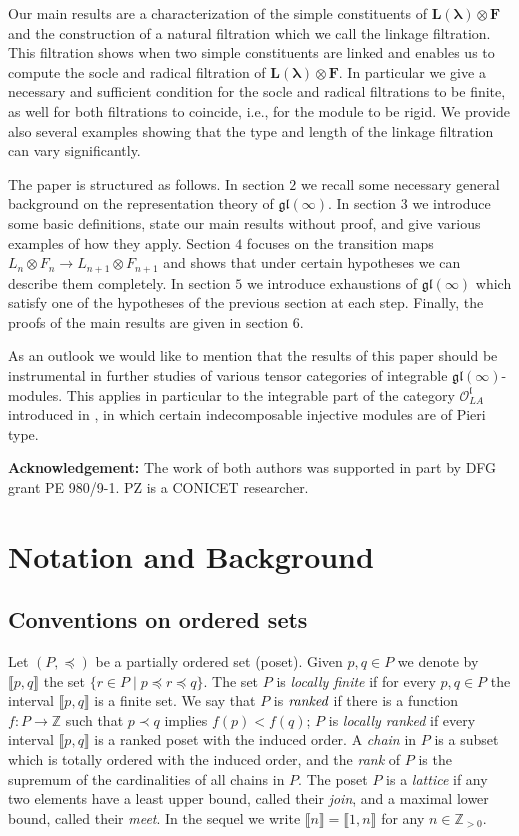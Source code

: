 \documentclass[11pt,fleqn]{amsart}
\newcommand\ZZ{\mathbb Z}
\renewcommand\to{\longrightarrow}
\theoremstyle{definition}
\theoremstyle{remark}
\theoremstyle{remark}
\newcommand\gl{\mathfrak{gl}}
\newcommand\interval[1]{\llbracket{#1}\rrbracket}
\newcommand\lie[1]{\mathfrak{#1}}
\newcommand\wt[1]{\boldsymbol{#1}}
\begin{document}
Our main results are a characterization of the simple constituents of $\mathbf
L(\wt\lambda) \otimes \mathbf F$ and the construction of a natural filtration 
which we call the linkage filtration. This filtration shows when two simple 
constituents are linked and enables us to compute the socle and 
radical filtration of $\mathbf L(\wt\lambda) \otimes \mathbf F$. In particular 
we give a necessary and sufficient condition for the socle and radical 
filtrations to be finite, as well for both filtrations to coincide, i.e., for 
the module to be rigid. We provide also 
several examples showing that the type and length of the linkage filtration can 
vary significantly.

The paper is structured as follows. In section $2$ we recall some necessary 
general background on the representation theory of $\gl(\infty)$. In section
$3$ we introduce some basic definitions, state our main results without proof, 
and give various examples of how they apply. Section $4$ focuses on the 
transition maps $L_n \otimes F_n \to L_{n+1} \otimes F_{n+1}$ and shows that 
under certain hypotheses we can describe them completely. In section $5$ we 
introduce exhaustions of $\gl(\infty)$ which satisfy one of the hypotheses of 
the previous section at each step. Finally, the proofs of the main results are 
given in section $6$.

As an outlook we would like to mention that the results of this paper should be 
instrumental in further studies of various tensor categories of integrable 
$\gl(\infty)$-modules. This applies in particular to the integrable part of the
category $\mathcal O_{LA}^{\lie l}$ introduced in \cite{Zadunaisky22}, in which 
certain indecomposable injective modules are of Pieri type.

\textbf{Acknowledgement:} The work of both authors was supported in part by  
DFG grant PE 980/9-1. PZ is a CONICET researcher.

\section{Notation and Background}

\subsection{Conventions on ordered sets}
Let $(P, \preceq)$ be a partially ordered set (poset). Given $p,q\in P$ we 
denote by $\interval{p,q}$ the set $\{r \in P \mid p \preceq r \preceq q\}$. 
The set $P$ is \emph{locally finite} if for every $p,q \in P$ the interval 
$\interval{p,q}$ is a finite set. We say that $P$ is $\emph{ranked}$ if there 
is a function $f: P \to \ZZ$ such that $p \prec q$ implies $f(p) < f(q)$; $P$ 
is \emph{locally ranked} if every interval $\interval{p,q}$ is a ranked poset 
with 
the induced order. A \emph{chain} in $P$ is a subset which is totally ordered 
with the induced order, and the \emph{rank} of $P$ is the supremum of the 
cardinalities of all chains in $P$. The poset $P$ is a \emph{lattice} if any 
two elements have a least upper bound, called their \emph{join}, and a maximal 
lower bound, called their \emph{meet}. In the sequel we write $\interval n = 
\interval{1,n}$ for any $n \in \ZZ_{>0}$. 
\end{document}
